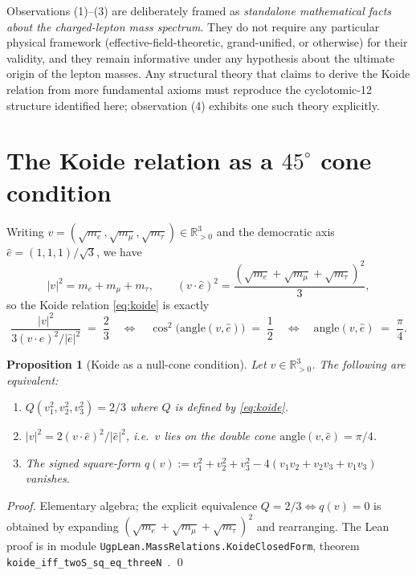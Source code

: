 \documentclass[11pt]{article}
\newtheorem{proposition}[theorem]{Proposition}
\theoremstyle{remark}
\begin{document}
Observations (1)--(3) are deliberately framed as \emph{standalone mathematical facts about the charged-lepton mass spectrum}.  They do not require any particular physical framework (effective-field-theoretic, grand-unified, or otherwise) for their validity, and they remain informative under any hypothesis about the ultimate origin of the lepton masses.  Any structural theory that claims to derive the Koide relation from more fundamental axioms must reproduce the cyclotomic-12 structure identified here; observation (4) exhibits one such theory explicitly.

\section{The Koide relation as a \texorpdfstring{$45^\circ$}{45-degree} cone condition}
\label{sec:geometry}

Writing $v = (\sqrt{m_e}, \sqrt{m_\mu}, \sqrt{m_\tau}) \in \mathbb{R}^3_{> 0}$ and the democratic axis $\hat{e} = (1,1,1)/\sqrt{3}$, we have
\[
|v|^2 = m_e + m_\mu + m_\tau, \qquad (v \cdot \hat{e})^2 = \frac{(\sqrt{m_e} + \sqrt{m_\mu} + \sqrt{m_\tau})^2}{3},
\]
so the Koide relation \eqref{eq:koide} is exactly
\[
\frac{|v|^2}{3 (v \cdot \hat{e})^2 / |\hat{e}|^2} \;=\; \frac{2}{3}
\quad\Longleftrightarrow\quad
\cos^2\!\bigl(\mathrm{angle}(v, \hat{e})\bigr) \;=\; \frac{1}{2}
\quad\Longleftrightarrow\quad
\mathrm{angle}(v, \hat{e}) \;=\; \frac{\pi}{4}.
\]

\begin{proposition}[Koide as a null-cone condition]
\label{prop:koide_cone}
Let $v \in \mathbb{R}^3_{> 0}$.  The following are equivalent:
\begin{enumerate}[leftmargin=1.3em,itemsep=0.05em]
  \item $Q(v_1^2, v_2^2, v_3^2) = 2/3$ where $Q$ is defined by \eqref{eq:koide}.
  \item $|v|^2 = 2 (v \cdot \hat{e})^2 / |\hat{e}|^2$, i.e.\ $v$ lies on the double cone $\mathrm{angle}(v, \hat{e}) = \pi/4$.
  \item The signed square-form $q(v) := v_1^2 + v_2^2 + v_3^2 - 4(v_1 v_2 + v_2 v_3 + v_1 v_3)$ vanishes.
\end{enumerate}
\end{proposition}

\noindent \emph{Proof.} Elementary algebra; the explicit equivalence $Q = 2/3 \Leftrightarrow q(v) = 0$ is obtained by expanding $(\sqrt{m_e}+\sqrt{m_\mu}+\sqrt{m_\tau})^2$ and rearranging.  The Lean proof is in module \nolinkurl{UgpLean.MassRelations.KoideClosedForm}, theorem \nolinkurl{koide_iff_twoS_sq_eq_threeN}~\cite{ugp-lean}. \qed
\end{document}
